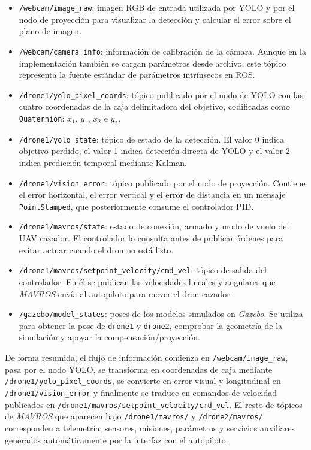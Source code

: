 \begin{itemize}
    \item \verb|/webcam/image_raw|: imagen RGB de entrada utilizada por YOLO y por el nodo de proyección para visualizar la detección y calcular el error sobre el plano de imagen.
    \item \verb|/webcam/camera_info|: información de calibración de la cámara. Aunque en la implementación también se cargan parámetros desde archivo, este tópico representa la fuente estándar de parámetros intrínsecos en ROS.
    \item \verb|/drone1/yolo_pixel_coords|: tópico publicado por el nodo de YOLO con las cuatro coordenadas de la caja delimitadora del objetivo, codificadas como \texttt{Quaternion}: $x_1$, $y_1$, $x_2$ e $y_2$.
    \item \verb|/drone1/yolo_state|: tópico de estado de la detección. El valor 0 indica objetivo perdido, el valor 1 indica detección directa de YOLO y el valor 2 indica predicción temporal mediante Kalman.

    \item \verb|/drone1/vision_error|: tópico publicado por el nodo de proyección. Contiene el error horizontal, el error vertical y el error de distancia en un mensaje \texttt{PointStamped}, que posteriormente consume el controlador PID.
    \item \verb|/drone1/mavros/state|: estado de conexión, armado y modo de vuelo del UAV cazador. El controlador lo consulta antes de publicar órdenes para evitar actuar cuando el dron no está listo.
    \item \verb|/drone1/mavros/setpoint_velocity/cmd_vel|: tópico de salida del controlador. En él se publican las velocidades lineales y angulares que \textit{MAVROS} envía al autopiloto para mover el dron cazador.
    \item \verb|/gazebo/model_states|: poses de los modelos simulados en \textit{Gazebo}. Se utiliza para obtener la pose de \texttt{drone1} y \texttt{drone2}, comprobar la geometría de la simulación y apoyar la compensación/proyección.

\end{itemize}

\vspace{0.3cm}

De forma resumida, el flujo de información comienza en \verb|/webcam/image_raw|, pasa por el nodo YOLO, se transforma en coordenadas de caja mediante \verb|/drone1/yolo_pixel_coords|, se convierte en error visual y longitudinal en \verb|/drone1/vision_error| y finalmente se traduce en comandos de velocidad publicados en \verb|/drone1/mavros/setpoint_velocity/cmd_vel|. El resto de tópicos de \textit{MAVROS} que aparecen bajo \verb|/drone1/mavros/| y \verb|/drone2/mavros/| corresponden a telemetría, sensores, misiones, parámetros y servicios auxiliares generados automáticamente por la interfaz con el autopiloto.

